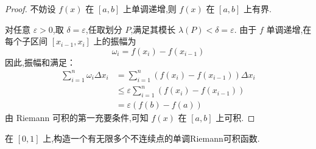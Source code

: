 \begin{proof}
	不妨设 $f(x)$ 在 $[a,b]$ 上单调递增,则 $f(x)$ 在 $[a,b]$ 上有界.
	
	对任意 $\varepsilon>0$,取 $\delta = \varepsilon$,任取划分 $P$,满足其模长 $\lambda(P) < \delta = \varepsilon$.
	由于 $f$ 单调递增,在每个子区间 $[x_{i-1},x_i]$ 上的振幅为
	\[
	\omega_i = f(x_i) - f(x_{i-1})
	\]
	因此,振幅和满足：
	\[
	\begin{aligned}
		\sum_{i=1}^n \omega_i \Delta x_i &= \sum_{i=1}^n \left(f(x_i) - f(x_{i-1})\right) \Delta x_i \\
		&\leq \varepsilon \sum_{i=1}^n \left(f(x_i) - f(x_{i-1})\right) \\
		&= \varepsilon \left(f(b) - f(a)\right)
	\end{aligned}
	\]
	由 Riemann 可积的第一充要条件,可知 $f(x)$ 在 $[a,b]$ 上可积.
	
	
\end{proof} 
\begin{problem}
	在 $[0,1]$ 上,构造一个有无限多个不连续点的单调Riemann可积函数.
\end{problem}
